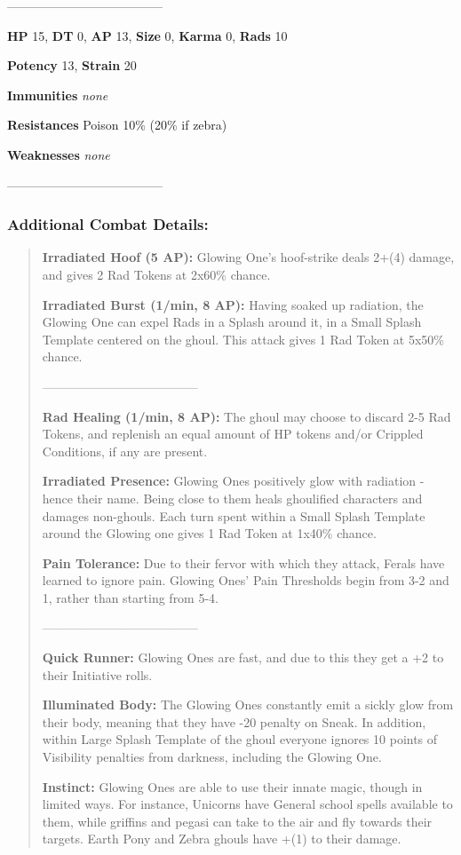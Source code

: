 \documentclass[11pt,a4paper,twocolumn]{book}
\begin{document}
	--------------------------------------
	
	\noindent
	\textbf{HP} 15, \textbf{DT} 0, \textbf{AP} 13, \textbf{Size} 0, \textbf{Karma} 0, \textbf{Rads} 10
	
	\noindent
	\textbf{Potency} 13, \textbf{Strain} 20
	
	\noindent
	\textbf{Immunities} \emph{none}
	
	\noindent
	\textbf{Resistances} Poison 10\% (20\% if zebra)
	
	\noindent
	\textbf{Weaknesses} \emph{none} %
	
	--------------------------------------
	
	\subsubsection*{Additional Combat Details:}
	\begin{verse}
		\textbf{Irradiated Hoof (5 AP):} Glowing One's hoof-strike deals 2+(4) damage, and gives 2 Rad Tokens at 2x60\% chance.
		
		\textbf{Irradiated Burst (1/min, 8 AP):} Having soaked up radiation, the Glowing One can expel Rads in a Splash around it, in a Small Splash Template centered on the ghoul. This attack gives 1 Rad Token at 5x50\% chance.
		
		--------------------------------------
		
		\textbf{Rad Healing (1/min, 8 AP):} The ghoul may choose to discard 2-5 Rad Tokens, and replenish an equal amount of HP tokens and/or Crippled Conditions, if any are present.
		
		\textbf{Irradiated Presence:} Glowing Ones positively glow with radiation - hence their name. Being close to them heals ghoulified characters and damages non-ghouls. Each turn spent within a Small Splash Template around the Glowing one gives 1 Rad Token at 1x40\% chance.
		
		\textbf{Pain Tolerance:} Due to their fervor with which they attack, Ferals have learned to ignore pain. Glowing Ones' Pain Thresholds begin from 3-2 and 1, rather than starting from 5-4.
		
		--------------------------------------		
		
		\textbf{Quick Runner:} Glowing Ones are fast, and due to this they get a +2 to their Initiative rolls.
		
		\textbf{Illuminated Body:} The Glowing Ones constantly emit a sickly glow from their body, meaning that they have -20 penalty on Sneak. In addition, within Large Splash Template of the ghoul everyone ignores 10 points of Visibility penalties from darkness, including the Glowing One.
		
		
		\textbf{Instinct:} Glowing Ones are able to use their innate magic, though in limited ways. For instance, Unicorns have General school spells available to them, while griffins and pegasi can take to the air and fly towards their targets. Earth Pony and Zebra ghouls have +(1) to their damage. 

	\end{verse}
\end{document}
